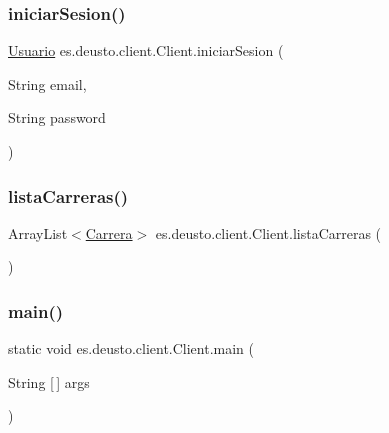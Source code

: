 \mbox{\label{classes_1_1deusto_1_1client_1_1_client_a4cc1480125fa35b37c37e8e1e79d91f6}} 
\subsubsection{\texorpdfstring{iniciarSesion()}{iniciarSesion()}}
{\footnotesize\ttfamily \mbox{\hyperlink{classes_1_1deusto_1_1server_1_1jdo_1_1_usuario}{Usuario}} es.\+deusto.\+client.\+Client.\+iniciar\+Sesion (\begin{DoxyParamCaption}\item[{String}]{email,  }\item[{String}]{password }\end{DoxyParamCaption})}

\mbox{\label{classes_1_1deusto_1_1client_1_1_client_abf1f982fbf3beeaba8bdcf66a50cb489}} 
\subsubsection{\texorpdfstring{listaCarreras()}{listaCarreras()}}
{\footnotesize\ttfamily Array\+List$<$\mbox{\hyperlink{classes_1_1deusto_1_1server_1_1jdo_1_1_carrera}{Carrera}}$>$ es.\+deusto.\+client.\+Client.\+lista\+Carreras (\begin{DoxyParamCaption}{ }\end{DoxyParamCaption})}

\mbox{\label{classes_1_1deusto_1_1client_1_1_client_a69a7526d0af9cb2341f4bf341b501152}} 
\subsubsection{\texorpdfstring{main()}{main()}}
{\footnotesize\ttfamily static void es.\+deusto.\+client.\+Client.\+main (\begin{DoxyParamCaption}\item[{String \mbox{[}$\,$\mbox{]}}]{args }\end{DoxyParamCaption})\hspace{0.3cm}{\ttfamily [static]}}

